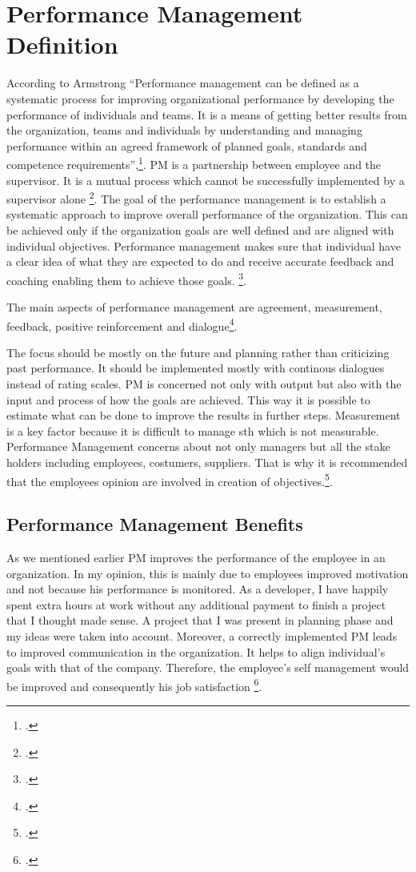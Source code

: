 \newpage
\section{Performance Management Definition} \label{definition}
According to Armstrong \enquote{\ac{Performance management} can be defined as a systematic process for
improving organizational performance by developing the performance of
individuals and teams. It is a means of getting better results from the
organization, teams and individuals by understanding and managing
performance within an agreed framework of planned goals, standards
and competence requirements},\footcite[See][S. 1]{Armstrong2006}.
\ac{PM} is a partnership between employee and the supervisor. It is a mutual process which cannot be successfully implemented by a supervisor alone \footcite{Cadwell2000}.  
 The goal of the performance management is to establish a systematic approach to improve overall performance of the organization. This can be achieved only if the organization goals are well defined and are aligned with individual objectives. Performance management makes sure that individual have a clear idea  of what they are expected to do and receive accurate feedback and coaching enabling them to achieve those goals. \footcite[See][]{Armstrong2006}.

The main aspects of performance management are agreement, measurement, feedback, positive reinforcement
and dialogue\footcite[See][]{Armstrong2006}.

The focus should be mostly on the future and planning rather than criticizing past performance. It should be implemented mostly with continous dialogues instead of rating scales. \ac{PM} is concerned not only with output but also with the input and process of how the goals are achieved. This way it is possible to estimate what can be done to improve the results in further steps. Measurement is a key factor because it is difficult to manage sth which is not measurable. Performance Management concerns about not only managers but all the stake holders including employees, costumers, suppliers. That is why it is recommended that the employees opinion are involved in creation of objectives.\footcite[See][]{Armstrong2006}.
 	 	
\subsection{Performance Management Benefits} \label{benefits}
As we mentioned earlier \ac{PM} improves the performance of the employee in an organization. In my opinion, this is mainly due to employees improved motivation and not because his performance is monitored. As a developer, I have happily spent extra hours at work without any additional payment to finish a project that I thought made sense. A project that I was present in planning phase and my ideas were taken into account. Moreover, a correctly implemented \ac{PM} leads to improved communication in the organization. It helps to align individual's goals with that of the company. Therefore, the employee's self management would be improved and consequently his job satisfaction \footcite[See][]{Cadwell2000}. 


